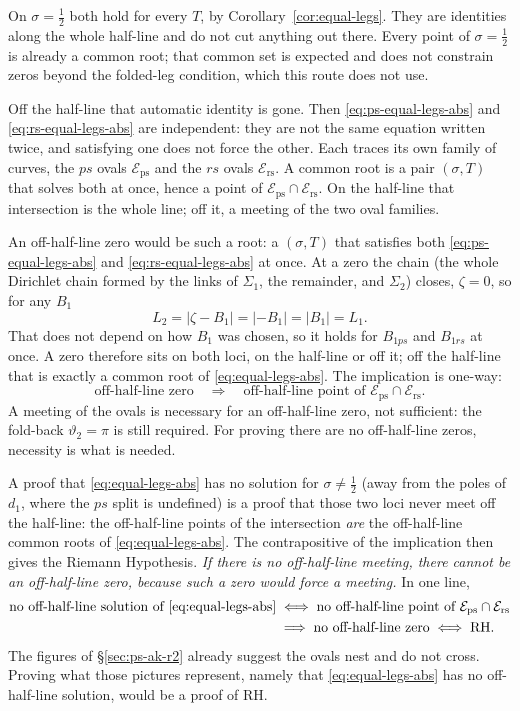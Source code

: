 \documentclass[11pt]{article}
\theoremstyle{definition}
\begin{document}
On $\sigma=\tfrac12$ both hold for every $T$, by
Corollary~\ref{cor:equal-legs}. They are identities along the whole
half-line and do not cut anything out there. Every point of
$\sigma=\tfrac12$ is already a common root; that common set is expected
and does not constrain zeros beyond the folded-leg condition, which this
route does not use.

Off the half-line that automatic identity is gone. Then
\eqref{eq:ps-equal-legs-abs} and \eqref{eq:rs-equal-legs-abs} are
independent: they are not the same equation written twice, and satisfying
one does not force the other. Each traces its own family of curves, the
$ps$ ovals $\mathcal{E}_{\mathrm{ps}}$ and the $rs$ ovals
$\mathcal{E}_{\mathrm{rs}}$. A common root is a pair $(\sigma,T)$ that
solves both at once, hence a point of
$\mathcal{E}_{\mathrm{ps}}\cap\mathcal{E}_{\mathrm{rs}}$. On the half-line
that intersection is the whole line; off it, a meeting of the two oval
families.

An off-half-line zero would be such a root: a $(\sigma,T)$ that
satisfies both \eqref{eq:ps-equal-legs-abs} and
\eqref{eq:rs-equal-legs-abs} at once. At a zero the chain (the whole Dirichlet chain formed by the links of
$\Sigma_1$, the remainder, and $\Sigma_2$) closes,
$\zeta=0$, so for any $B_1$
\[
L_2=|\zeta-B_1|=|-B_1|=|B_1|=L_1.
\]
That does not depend on how $B_1$ was chosen, so it holds for $B_{1ps}$
and $B_{1rs}$ at once. A zero therefore sits on both loci, on the
half-line or off it; off the half-line that is exactly a common root of
\eqref{eq:equal-legs-abs}. The implication is one-way:
\[
\text{off-half-line zero}
\quad\Longrightarrow\quad
\text{off-half-line point of }\mathcal{E}_{\mathrm{ps}}\cap\mathcal{E}_{\mathrm{rs}}.
\]
A meeting of the ovals is necessary for an off-half-line zero, not
sufficient: the fold-back $\vartheta_2=\pi$ is still required. For
proving there are no off-half-line zeros, necessity is what is needed.

A proof that \eqref{eq:equal-legs-abs} has no solution for
$\sigma\neq\tfrac12$ (away from the poles of $d_1$, where the $ps$
split is undefined) is a proof that those two loci never meet off the
half-line: the off-half-line points of the intersection
\emph{are} the off-half-line common roots of \eqref{eq:equal-legs-abs}.
The contrapositive of the implication then gives the Riemann Hypothesis.
\emph{If there is no off-half-line meeting, there cannot be an off-half-line
zero, because such a zero would force a meeting.} In one line,
\begin{align*}
\text{no off-half-line solution of \eqref{eq:equal-legs-abs}}
&\;\Longleftrightarrow\;
\text{no off-half-line point of }\mathcal{E}_{\mathrm{ps}}\cap\mathcal{E}_{\mathrm{rs}}
\\
&\;\Longrightarrow\;
\text{no off-half-line zero}
\;\Longleftrightarrow\;
\text{RH}.
\end{align*}
The figures of \S\ref{sec:ps-ak-r2} already suggest the ovals nest and do
not cross. Proving what those pictures represent, namely that
\eqref{eq:equal-legs-abs} has no off-half-line solution, would be a
proof of RH.
\end{document}

